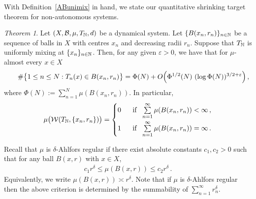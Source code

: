 \documentclass[11pt,reqno]{amsart}
\newcommand{\N}{{\Bbb N}}
\newcommand{\0}{\mathbf{0}}
\newtheorem{TAA}{Theorem}
\theoremstyle{remark}
\numberwithin{equation}{section}
\newtheorem{TAA}{Theorem}
\theoremstyle{remark}
\numberwithin{equation}{section}
\begin{document}
 With Definition~\ref{ABunimix} in hand, we state our quantitative shrinking target theorem for non-autonomous systems. 

\begin{TAA}\label{ABthA}
Let $(X,\mathcal{B},\mu,T_\N,d)$ be a dynamical system. Let $\{B(x_n,r_n)\}_{n \in \N}$ be a sequence of balls in $X$ with centres $x_n$ and decreasing radii $r_n$. Suppose that $T_\N$ is uniformly mixing at $\{x_n\}_{n \in \N}$.
Then, for any given $\varepsilon>0$, we have that for $\mu$-almost every $x \in X$
\begin{eqnarray}\label{asymt}
   ~\hspace{4.5mm} \# \big\{ 1\le n \le   N :    T_{n}(x) \in B(x_n,r_n) \big\} =\Phi(N)+O\Bigl(\Phi^{1/2}(N) \ (\log\Phi(N))^{3/2+\varepsilon}\Bigr) \, ,
\end{eqnarray}
 where $\Phi(N):=\sum\limits_{n=1}^N \mu (B(x_n,r_n)) $.
In particular,
 \begin{eqnarray*}
   \mu\big( \mathcal{W}(T_\N,\{x_n, r_n\}) \big) = \begin{cases}
        0 &\text{ \ if}\ \  \sum\limits_{n=1}^\infty \mu(B(x_n,r_n)) <\infty \, , \\[2ex]
        1 &\text{ \ if}\ \  \sum\limits_{n=1}^\infty\mu(B(x_n,r_n))
        =\infty \, .
    \end{cases}
	\end{eqnarray*}
 
\end{TAA}
Recall that $\mu$ is $\delta$-Ahlfors regular if there exist absolute constants $c_1,c_2>0$ such that for any ball $B(x,r)$ with $x \in X$, \begin{eqnarray}\label{defahl}
    c_1r^\delta \leq \mu(B(x,r)) \leq c_2r^\delta \, .
\end{eqnarray}
Equivalently, we write $\mu(B(x,r)) \asymp r^\delta$.
Note that if $\mu$ is $\delta$-Ahlfors regular then the above criterion is determined by the summability of $\sum_{n=1}^\infty r_n^\delta$. 
\end{document}
